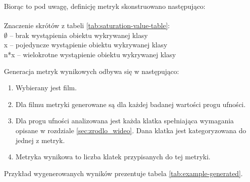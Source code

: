 Biorąc to pod uwagę, definicję metryk skonstruowano następująco: \\ \\ \noindent
Znaczenie skrótów z tabeli \ref{tab:saturation-value-table}: \\
$\emptyset$ -- brak wystąpienia obiektu wykrywanej klasy \\
x -- pojedyncze wystąpienie obiektu wykrywanej klasy \\
n*x -- wielokrotne wystąpienie obiektu wykrywanej klasy


Generacja metryk wynikowych odbywa się w następująco:
\begin{enumerate}
    \item Wybierany jest film.
    \item Dla filmu metryki generowane są dla każdej badanej wartości progu ufności.
    \item Dla progu ufności analizowana jest każda klatka spełniająca wymagania opisane w rozdziale \ref{sec:zrodlo_wideo}. Dana klatka jest kategoryzowana do jednej z metryk.
    \item Metryka wynikowa to liczba klatek przypisanych do tej metryki.
\end{enumerate} 
Przykład wygenerowanych wyników prezentuje tabela \ref{tab:example-generated}.

